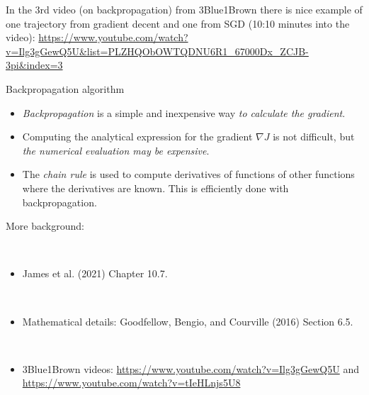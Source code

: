 \documentclass[
  10pt,
  ignorenonframetext,
]{beamer}
\providecommand{\tightlist}{%
  \setlength{\itemsep}{0pt}\setlength{\parskip}{0pt}}
\begin{document}
\begin{frame}
In the 3rd video (on backpropagation) from 3Blue1Brown there is nice
example of one trajectory from gradient decent and one from SGD (10:10
minutes into the video):
\url{https://www.youtube.com/watch?v=Ilg3gGewQ5U\&list=PLZHQObOWTQDNU6R1_67000Dx_ZCJB-3pi\&index=3}
\end{frame}

\begin{frame}
\begin{block}{Backpropagation algorithm}
\protect\hypertarget{backpropagation-algorithm}{}
\(~\)

\begin{itemize}
\tightlist
\item
  \emph{Backpropagation} is a simple and inexpensive way \emph{to
  calculate the gradient}.
\end{itemize}

\vspace{2mm}

\begin{itemize}
\tightlist
\item
  Computing the analytical expression for the gradient \(\nabla J\) is
  not difficult, but \emph{the numerical evaluation may be expensive}.
\end{itemize}

\vspace{2mm}

\vspace{2mm}

\begin{itemize}
\tightlist
\item
  The \emph{chain rule} is used to compute derivatives of functions of
  other functions where the derivatives are known. This is efficiently
  done with backpropagation.
\end{itemize}
\end{block}
\end{frame}

\begin{frame}
More background:

\(~\)

\begin{itemize}
\tightlist
\item
  James et al. (2021) Chapter 10.7.
\end{itemize}

\(~\)

\begin{itemize}
\tightlist
\item
  Mathematical details: Goodfellow, Bengio, and Courville (2016) Section
  6.5.\\
\end{itemize}

\(~\)

\begin{itemize}
\tightlist
\item
  3Blue1Brown videos: \url{https://www.youtube.com/watch?v=Ilg3gGewQ5U}
  and \url{https://www.youtube.com/watch?v=tIeHLnjs5U8}
\end{itemize}
\end{frame}
\end{document}
